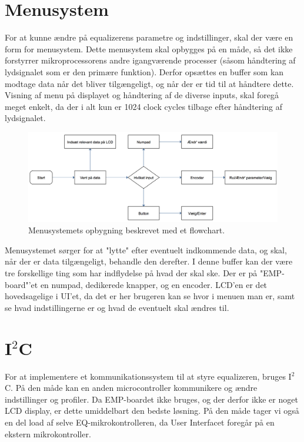 \section{Menusystem}\label{sec:menu}
For at kunne ændre på equalizerens parametre og indstillinger, skal der være en form for menusystem. Dette menusystem skal opbygges på en måde, så det ikke forstyrrer mikroprocessorens andre igangværende processer (såsom håndtering af lydsignalet som er den primære funktion). Derfor opsættes en buffer som kan modtage data når det bliver tilgængeligt, og når der er tid til at håndtere dette. Visning af menu på displayet og håndtering af de diverse inputs, skal foregå meget enkelt, da der i alt kun er 1024 clock cycles tilbage efter håndtering af lydsignalet. \\

\begin{figure}[h]
	\centering
	\includegraphics[width=15cm]{billeder/ui_flowchart}
	\caption{Menusystemets opbygning beskrevet med et flowchart. }
\end{figure}

Menusystemet sørger for at "lytte" efter eventuelt indkommende data, og skal, når der er data tilgængeligt, behandle den derefter. I denne buffer kan der være tre forskellige ting som har indflydelse på hvad der skal ske. Der er på "EMP-board"'et en numpad, dedikerede knapper, og en encoder. LCD'en er det hovedsagelige i UI'et, da det er her brugeren kan se hvor i menuen man er, samt se hvad indstillingerne er og hvad de eventuelt skal ændres til.

\section{I$^2$C}\label{sec:i2c}
For at implementere et kommunikationssystem til at styre equalizeren, bruges I$^2$C. På den måde kan en anden microcontroller kommunikere og ændre indstillinger og profiler. Da EMP-boardet ikke bruges, og der derfor ikke er noget LCD display, er dette umiddelbart den bedste løsning. På den måde tager vi også en del load af selve EQ-mikrokontrolleren, da User Interfacet foregår på en ekstern mikrokontroller.


